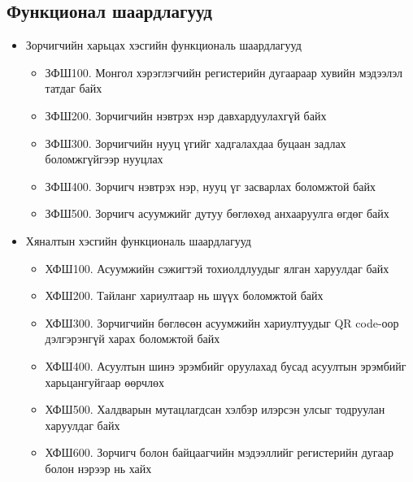 \subsection{Функционал шаардлагууд}
\begin{itemize}
    \item Зорчигчийн харьцах хэсгийн функциональ шаардлагууд 
    \begin{itemize}
        \item ЗФШ100. Монгол хэрэглэгчийн регистерийн дугаараар хувийн мэдээлэл татдаг байх
        \item ЗФШ200. Зорчигчийн нэвтрэх нэр давхардуулахгүй байх 
        \item ЗФШ300. Зорчигчийн нууц үгийг хадгалахдаа буцаан задлах боломжгүйгээр нууцлах
        \item ЗФШ400. Зорчигч нэвтрэх нэр, нууц үг засварлах боломжтой байх 
        \item ЗФШ500. Зорчигч асуумжийг дутуу бөглөхөд анхааруулга өгдөг байх  
    \end{itemize}

    \item Хяналтын хэсгийн функциональ шаардлагууд 
    \begin{itemize}
        \item ХФШ100. Асуумжийн сэжигтэй тохиолдлуудыг ялган харуулдаг байх
        \item ХФШ200. Тайланг хариултаар нь шүүх боломжтой байх
        \item ХФШ300. Зорчигчийн бөглөсөн асуумжийн хариултуудыг QR code-оор дэлгэрэнгүй харах боломжтой байх
        \item ХФШ400. Асуултын шинэ эрэмбийг оруулахад бусад асуултын эрэмбийг харьцангуйгаар өөрчлөх 
        \item ХФШ500. Халдварын мутацлагдсан хэлбэр илэрсэн улсыг тодруулан харуулдаг байх 
        \item ХФШ600. Зорчигч болон байцаагчийн мэдээллийг регистерийн дугаар болон нэрээр нь хайх
    \end{itemize}


\end{itemize}
